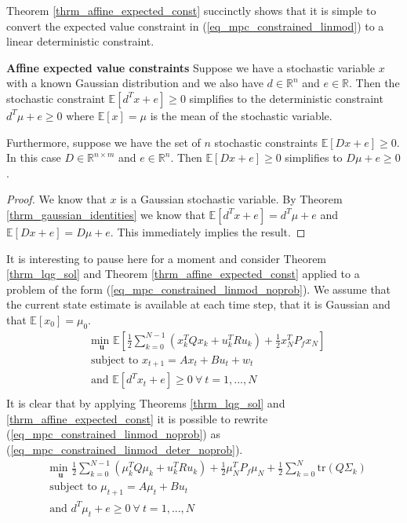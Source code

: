 Theorem \ref{thrm_affine_expected_const} succinctly shows that it is simple to convert the expected value constraint in (\ref{eq_mpc_constrained_linmod}) to a linear deterministic constraint.
\begin{thrm}
\textbf{Affine expected value constraints} Suppose we have a stochastic variable $x$ with a known Gaussian distribution and we also have $d \in \mathbb{R}^{n}$ and $e \in \mathbb{R}$. Then the stochastic constraint $\mathbb{E}[d^Tx + e] \geq 0$ simplifies to the deterministic constraint $d^T\mu + e \geq 0$ where $\mathbb{E}[x]= \mu$ is the mean of the stochastic variable. 

Furthermore, suppose we have the set of $n$ stochastic constraints $\mathbb{E}[Dx + e] \geq 0$. In this case $D \in \mathbb{R}^{n \times m}$ and $e \in \mathbb{R}^n$. Then $\mathbb{E}[Dx + e] \geq 0$ simplifies to $D\mu + e \geq 0$.  
\label{thrm_affine_expected_const}
\end{thrm}
\begin{proof}
We know that $x$ is a Gaussian stochastic variable. By Theorem \ref{thrm_gaussian_identities} we know that $\mathbb{E}[d^Tx + e] =d^T\mu + e$ and $\mathbb{E}[Dx + e] = D\mu + e$. This immediately implies the result.
\end{proof}
It is interesting to pause here for a moment and consider Theorem \ref{thrm_lqg_sol} and Theorem \ref{thrm_affine_expected_const} applied to a problem of the form (\ref{eq_mpc_constrained_linmod_noprob}). We assume that the current state estimate is available at each time step, that it is Gaussian and that $\mathbb{E}[x_0]=\mu_0$.
\begin{equation}
\begin{aligned}
&\underset{\mathbf{u}}{\text{min }} \mathbb{E}\left[ \frac{1}{2}\sum_{k=0}^{N-1} \left( x_k^TQx_k + u_k^TRu_k \right) + \frac{1}{2}x_N^TP_fx_N \right] \\
& \text{subject to } x_{t+1}=Ax_t+Bu_t + w_t \\
& \text{and } \mathbb{E}[d^Tx_t + e] \geq 0 ~\forall ~t=1,...,N \\
\end{aligned}
\label{eq_mpc_constrained_linmod_noprob}
\end{equation}
It is clear that by applying Theorems \ref{thrm_lqg_sol} and \ref{thrm_affine_expected_const} it is possible to rewrite (\ref{eq_mpc_constrained_linmod_noprob}) as (\ref{eq_mpc_constrained_linmod_deter_noprob}).
\begin{equation}
\begin{aligned}
&\underset{\mathbf{u}}{\text{min }} \frac{1}{2}\sum_{k=0}^{N-1} \left( \mu_k^TQ\mu_k + u_k^TRu_k \right) + \frac{1}{2}\mu_N^TP_f\mu_N + \frac{1}{2}\sum_{k=0}^N \text{tr}(Q\Sigma_k) \\
& \text{subject to } \mu_{t+1}=A\mu_t + Bu_t \\
& \text{and } d^T\mu_t + e \geq 0 ~\forall ~t=1,...,N\\
\end{aligned}
\label{eq_mpc_constrained_linmod_deter_noprob}
\end{equation}
